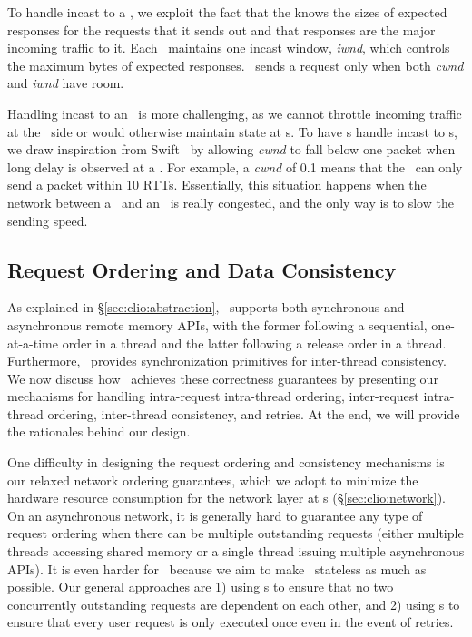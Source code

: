 To handle incast to a \CN, we exploit the fact that the \CN{} knows the sizes of expected responses for the requests that it sends out and that responses are the major incoming traffic to it.
Each \syslib\ maintains one incast window, \textit{iwnd}, which controls the maximum bytes of expected responses. \syslib\ sends a request only when both \textit{cwnd} and \textit{iwnd} have room.

Handling incast to an \MN\ is more challenging, as we cannot throttle incoming traffic at the \MN\ side or would otherwise maintain state at \MN{}s.
To have \CN{}s handle incast to \MN{}s, we draw inspiration from Swift~\cite{swift-sigcomm} by allowing \textit{cwnd} to fall below one packet when long delay is observed at a \CN. For example, a \textit{cwnd} of 0.1 means that the \CN\ can only send a packet within 10 RTTs.
Essentially, this situation happens when the network between a \CN\ and an \MN\ is really congested, and the only way is to slow the sending speed.

\subsection{Request Ordering and Data Consistency}
\label{sec:clio:ordering}

As explained in \S\ref{sec:clio:abstraction}, \sys\ supports both synchronous and asynchronous remote memory APIs, with the former following a sequential, one-at-a-time order in a thread and the latter following a release order in a thread.
Furthermore, \sys\ provides synchronization primitives for inter-thread consistency.
We now discuss how \sys\ achieves these correctness guarantees by presenting our mechanisms for handling intra-request intra-thread ordering, inter-request intra-thread ordering, inter-thread consistency, and retries.
At the end, we will provide the rationales behind our design.

One difficulty in designing the request ordering and consistency mechanisms is our relaxed network ordering guarantees, 
which we adopt to minimize the hardware resource consumption for the network layer at \MN{}s (\S\ref{sec:clio:network}).
On an asynchronous network, it is generally hard to guarantee any type of request ordering when there can be multiple outstanding requests (either multiple threads accessing shared memory or a single thread issuing multiple asynchronous APIs). It is even harder for \sys\ because we aim to make \MN\ stateless as much as possible.
Our general approaches are 1) using \CN{}s to ensure that no two concurrently outstanding requests are dependent on each other, and 2) using \MN{}s to ensure that every user request is only executed once even in the event of retries.

